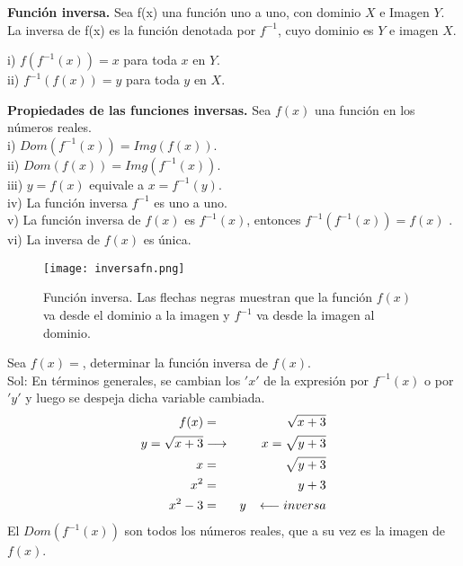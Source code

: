 \begin{mydef}
\textbf{Función inversa.} Sea f(x) una función uno a uno, con dominio $X$ e Imagen $Y$. La inversa de f(x) es la función denotada por $f^{-1}$, cuyo dominio es $Y$ e imagen $X$.

\noindent i) $f(f^{-1}(x))=x$ para toda $x$ en $Y$.\\
\noindent ii) $f^{-1}(f(x))=y$ para toda $y$ en $X$.\\
\end{mydef}

\begin{mydef}
\textbf{Propiedades de las funciones inversas.} Sea $f(x)$ una función en los números reales.\\

\noindent i) $Dom(f^{-1}(x))=Img(f(x))$. \\

\noindent ii) $Dom(f(x))=Img(f^{-1}(x))$. \\

\noindent iii) $y=f(x)$ equivale a $x=f^{-1}(y)$. \\

\noindent iv) La función inversa $f^{-1}$ es uno a uno. \\

\noindent v) La función inversa de $f(x)$ es $f^{-1}(x)$, entonces $f^{-1}(f^{-1}(x))=f(x)$ . \\

\noindent vi) La inversa de $f(x)$ es única. \\
\label{propinv}
\end{mydef}

\begin{center}
\begin{figure}[h!]
\centering
\texttt{[image: inversafn.png]}
\caption[Función inversa.]{Función inversa. Las flechas negras muestran que la función $f(x)$ va desde el dominio a la imagen y $f^{-1}$ va desde la imagen al dominio.} \label{inversafn}
\end{figure}
\end{center}

\begin{myexample}
Sea $f(x)=$, determinar la función inversa de $f(x)$. \\

\noindent Sol: En términos generales, se cambian los $'x'$ de la expresión por $f^{-1}(x)$ o por $'y'$ y luego se despeja dicha variable cambiada.\\
\begin{eqnarray*}
f(x)&=&\sqrt{x+3} \\
y=\sqrt{x+3}& \longrightarrow &x=\sqrt{y+3} \\
x&=&\sqrt{y+3}\\
x^{2}&=&y+3 \\
x^{2}-3 &=&y \hspace*{8px}\longleftarrow inversa\\
\end{eqnarray*}
El $Dom(f^{-1}(x))$ son todos los números reales, que a su vez es la imagen de $f(x)$.
\end{myexample}

